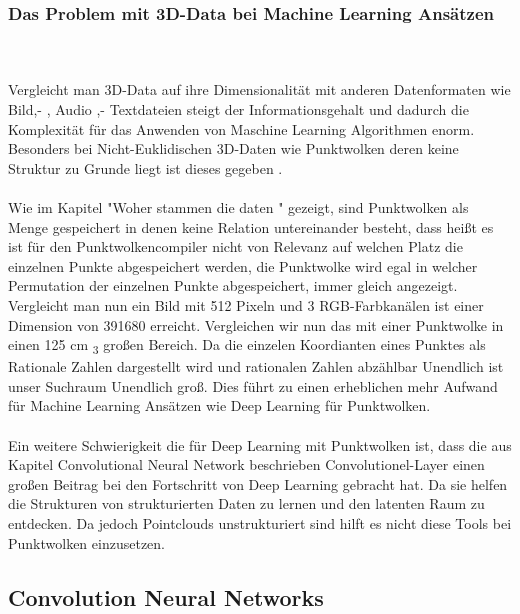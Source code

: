 \documentclass{llncs}
\begin{document}
\subsubsection{Das Problem mit 3D-Data bei Machine Learning Ansätzen}
~\\\\
Vergleicht man 3D-Data auf ihre Dimensionalität mit anderen Datenformaten wie Bild,- , Audio ,- Textdateien steigt der Informationsgehalt und dadurch die Komplexität für das Anwenden von Maschine Learning Algorithmen enorm. Besonders bei Nicht-Euklidischen 3D-Daten wie Punktwolken deren keine Struktur zu Grunde liegt ist dieses gegeben \cite{3dprob}.
\\\\
Wie im Kapitel "Woher stammen die daten " gezeigt, sind Punktwolken als Menge gespeichert in denen keine Relation untereinander besteht, dass heißt es ist für den Punktwolkencompiler nicht von Relevanz auf welchen Platz die einzelnen Punkte abgespeichert werden, die Punktwolke wird egal in welcher Permutation der einzelnen Punkte abgespeichert, immer gleich angezeigt. Vergleicht man nun ein Bild mit 512 Pixeln und 3 RGB-Farbkanälen ist einer Dimension von 391680 erreicht. Vergleichen wir nun das mit einer Punktwolke in einen 125 cm \textsubscript{3} großen Bereich. Da die einzelen Koordianten eines Punktes als Rationale Zahlen dargestellt wird und rationalen Zahlen abzählbar Unendlich ist unser Suchraum Unendlich groß. Dies führt zu einen erheblichen mehr Aufwand für Machine Learning Ansätzen wie Deep Learning für Punktwolken.
\\\\
Ein weitere Schwierigkeit die für Deep Learning mit Punktwolken ist, dass die aus Kapitel Convolutional Neural Network beschrieben Convolutionel-Layer einen großen Beitrag bei den Fortschritt von Deep Learning gebracht hat. Da sie helfen die Strukturen von strukturierten Daten zu lernen und den latenten Raum zu entdecken. Da jedoch Pointclouds unstrukturiert sind hilft es nicht diese Tools bei Punktwolken einzusetzen\cite{3dgan}.  

\subsection{Convolution Neural Networks}
\end{document}
